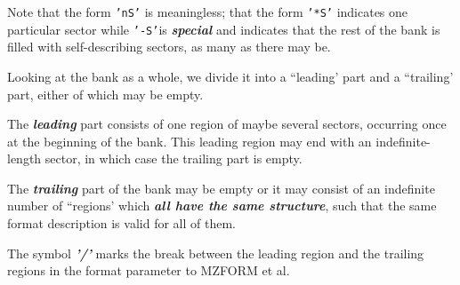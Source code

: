 Note that the form {\tt 'nS'} is meaningless;
that the form {\tt '*S'}
indicates one particular sector while
{\tt '-S'}is {\bf\it special} and
indicates that the rest of the bank is filled
with self-describing sectors,
as many as there may be.
\par Looking at the bank as a whole,
we divide it into a ``leading' part and a ``trailing' part,
either of which may be empty.
\par The {\bf\it leading}
part consists of one region of maybe several sectors,
occurring once at the beginning of the bank.
This leading region may end with an indefinite-length sector,
in which case the trailing part is empty.
\par The {\bf\it trailing} part of the bank may be empty or it may consist
of an indefinite number of ``regions' which
{\bf\it all have the same structure},
such that the same format description is valid for all of them.
\par
The symbol {\bf\it '/'} marks the break between the leading region
and the trailing regions in the format parameter to MZFORM et al.
